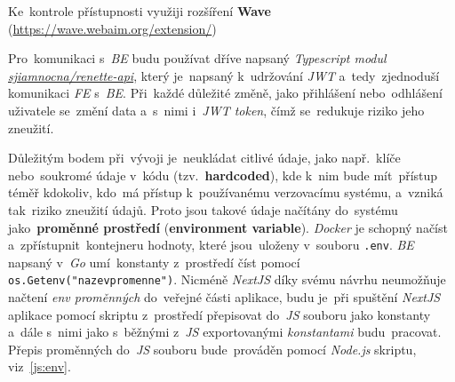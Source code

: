 \documentclass[11pt,a4paper]{report}
\let\oldacrshort\acrshort
\renewcommand{\acrshort}[1]{\emph{\normalsize\color[rgb]{0,0,0}\noindent\oldacrshort{#1}}}
\begin{document}
            Ke~kontrole přístupnosti využiji rozšíření \textbf{Wave} (\url{https://wave.webaim.org/extension/})

            Pro~komunikaci s~\acrshort{BE} budu používat dříve napsaný \emph{Typescript modul} \href{https://gitlab.com/sjiamnocna/renette-api}{\emph{sjiamnocna/renette-api}}, který je~napsaný k~udržování \acrshort{JWT} a~tedy~zjednoduší komunikaci \acrshort{FE} s~\acrshort{BE}. Při~každé důležité změně, jako přihlášení nebo~odhlášení uživatele se~změní data a~s~nimi i~\emph{JWT token}, čímž se~redukuje riziko jeho zneužití.

            Důležitým bodem při~vývoji je~neukládat citlivé údaje, jako např.~klíče nebo~soukromé údaje v~kódu (tzv.~\textbf{hardcoded}), kde k~nim bude mít~přístup téměř kdokoliv, kdo~má přístup k~používanému verzovacímu systému, a~vzniká tak~riziko zneužití údajů. Proto jsou takové údaje načítány do~systému jako~\textbf{proměnné prostředí} (\textbf{environment variable}). \emph{Docker} je schopný načíst a~zpřístupnit~kontejneru hodnoty, které jsou~uloženy v~souboru \texttt{.env}. \acrshort{BE} napsaný v~\emph{Go} umí~konstanty z~prostředí číst pomocí \texttt{os.Getenv("nazevpromenne")}. Nicméně \emph{NextJS} díky svému návrhu neumožňuje načtení \emph{env proměnných} do~veřejné části aplikace, budu je~při spuštění \emph{NextJS} aplikace pomocí skriptu z~prostředí přepisovat do~\acrshort{JS} souboru jako konstanty a~dále s~nimi jako s~běžnými z~\acrshort{JS} exportovanými \emph{konstantami} budu~pracovat. Přepis proměnných do~\acrshort{JS} souboru bude~prováděn pomocí \emph{Node.js} skriptu, viz~\ref{js:env}.
            
\end{document}

